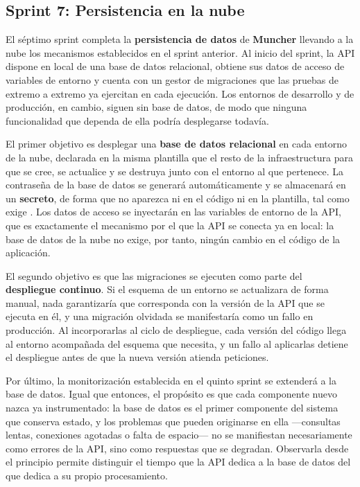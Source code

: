 \subsection*{Sprint 7: Persistencia en la nube}

El séptimo sprint completa la \textbf{persistencia de datos} de
\textbf{Muncher} llevando a la nube los mecanismos establecidos en el sprint
anterior. Al inicio del sprint, la API dispone en local de una base de datos
relacional, obtiene sus datos de acceso de variables de entorno y cuenta con
un gestor de migraciones que las pruebas de extremo a extremo ya ejercitan en
cada ejecución. Los entornos de desarrollo y de producción, en cambio, siguen
sin base de datos, de modo que ninguna funcionalidad que dependa de ella podría
desplegarse todavía.

El primer objetivo es desplegar una \textbf{base de datos relacional} en cada
entorno de la nube, declarada en la misma plantilla que el resto de la
infraestructura para que se cree, se actualice y se destruya junto con el
entorno al que pertenece. La contraseña de la base de datos se generará
automáticamente y se almacenará en un \textbf{secreto}, de forma que no
aparezca ni en el código ni en la plantilla, tal como exige
. Los datos de acceso se inyectarán en las variables de
entorno de la API, que es exactamente el mecanismo por el que la API se conecta
ya en local: la base de datos de la nube no exige, por tanto, ningún cambio en
el código de la aplicación.

El segundo objetivo es que las migraciones se ejecuten como parte del
\textbf{despliegue continuo}. Si el esquema de un entorno se actualizara de
forma manual, nada garantizaría que corresponda con la versión de la API que se
ejecuta en él, y una migración olvidada se manifestaría como un fallo en
producción. Al incorporarlas al ciclo de despliegue, cada versión del código
llega al entorno acompañada del esquema que necesita, y un fallo al aplicarlas
detiene el despliegue antes de que la nueva versión atienda peticiones.

Por último, la monitorización establecida en el quinto sprint se extenderá a
la base de datos. Igual que entonces, el propósito es que cada componente nuevo
nazca ya instrumentado: la base de datos es el primer componente del sistema
que conserva estado, y los problemas que pueden originarse en ella —consultas
lentas, conexiones agotadas o falta de espacio— no se manifiestan
necesariamente como errores de la API, sino como respuestas que se degradan.
Observarla desde el principio permite distinguir el tiempo que la API dedica a
la base de datos del que dedica a su propio procesamiento.

